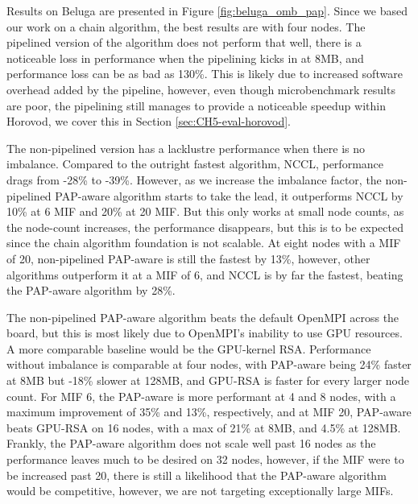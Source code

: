 

Results on Beluga are presented in Figure \ref{fig:beluga_omb_pap}.
Since we based our work on a chain algorithm, the best results are with four nodes.
The pipelined version of the algorithm does not perform that well, there is a noticeable loss in performance when the pipelining kicks in at 8MB, and performance loss can be as bad as 130\%.
This is likely due to increased software overhead added by the pipeline, however, even though microbenchmark results are poor, the pipelining still manages to provide a noticeable speedup within Horovod, we cover this in Section \ref{sec:CH5-eval-horovod}.

The non-pipelined version has a lacklustre performance when there is no imbalance.
Compared to the outright fastest algorithm, \gls{NCCL}, performance drags from -28\% to -39\%.
However, as we increase the imbalance factor, the non-pipelined \gls{PAP}-aware algorithm starts to take the lead, it outperforms \gls{NCCL} by 10\% at 6 \gls{MIF} and 20\% at 20 \gls{MIF}.
But this only works at small node counts, as the node-count increases, the performance disappears, but this is to be expected since the chain algorithm foundation is not scalable.
At eight nodes with a \gls{MIF} of 20, non-pipelined \gls{PAP}-aware is still the fastest by 13\%, however, other algorithms outperform it at a \gls{MIF} of 6, and \gls{NCCL} is by far the fastest, beating the \gls{PAP}-aware algorithm by 28\%.




The non-pipelined \gls{PAP}-aware algorithm beats the default OpenMPI across the board, but this is most likely due to OpenMPI's inability to use \gls{GPU} resources.
A more comparable baseline would be the \gls{GPU}-kernel \gls{RSA}.
Performance without imbalance is comparable at four nodes, with \gls{PAP}-aware being 24\% faster at 8MB but -18\% slower at 128MB, and \gls{GPU}-\gls{RSA} is faster for every larger node count.
For \gls{MIF} 6, the \gls{PAP}-aware is more performant at 4 and 8 nodes, with a maximum improvement of 35\% and 13\%, respectively, and at \gls{MIF} 20, \gls{PAP}-aware beats \gls{GPU}-\gls{RSA} on 16 nodes, with a max of 21\% at 8MB, and 4.5\% at 128MB.
Frankly, the \gls{PAP}-aware algorithm does not scale well past 16 nodes as the performance leaves much to be desired  on 32 nodes, however, if the \gls{MIF} were to be increased past 20, there is still a likelihood that the \gls{PAP}-aware algorithm would be competitive, however, we are not targeting exceptionally large \gls{MIF}s. 


